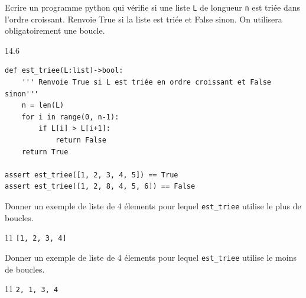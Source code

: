 \documentclass[a4paper,10pt]{report}
\def\ptsexoA{4}
\begin{document}

\renewcommand{\labelitemi}{\textbullet} %


\pagestyle{DS_FP}          %
\NomPrenomNote{}


\exods{\ptsexoA}

\begin{enumerate}
    \item Ecrire un programme python qui vérifie si une liste \verb|L| de longueur \verb|n| est triée dans l'ordre croissant. Renvoie True si la liste est triée et False sinon.
    On utilisera obligatoirement une boucle. 
    \begin{answer}{1}{4.6}
        \begin{verbatim}
def est_triee(L:list)->bool:
    ''' Renvoie True si L est triée en ordre croissant et False sinon'''
    n = len(L)
    for i in range(0, n-1):
        if L[i] > L[i+1]:
            return False
    return True    
    
assert est_triee([1, 2, 3, 4, 5]) == True
assert est_triee([1, 2, 8, 4, 5, 6]) == False

        \end{verbatim}
        \end{answer}

        \begin{minipage}{0.49\linewidth}
            \item Donner un exemple de liste de 4 élements pour lequel \verb|est_triee| utilise le plus de boucles.

    \end{minipage}\hfill
    \begin{minipage}{0.49\linewidth}
            \begin{answer}{1}{1}    \verb|[1, 2, 3, 4]|\end{answer}

    \end{minipage}

    \begin{minipage}{0.49\linewidth}
        \item Donner un exemple de liste de 4 élements pour lequel \verb|est_triee| utilise le moins de boucles.

\end{minipage}\hfill
\begin{minipage}{0.49\linewidth}
        \begin{answer}{1}{1}  \verb|2, 1, 3, 4|  \end{answer}

\end{minipage}

\end{enumerate}
\end{document}
